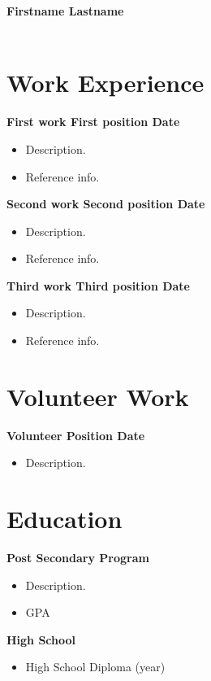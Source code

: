 \documentclass{article}
\begin{document}
{\selectfont

\begin{center}
\textbf{\huge Firstname Lastname}\\
\textbf{               }\\
\end{center}
\begin{minipage}[t]{0.66\textwidth}
\section*{Work Experience}
\textbf{First work \textbar{} First position \textbar{} Date}
\begin{itemize}
\item Description.
\item Reference info.
\end{itemize}
\textbf{Second work \textbar{} Second position \textbar{} Date}
\begin{itemize}
\item Description.
\item Reference info.
\end{itemize}
\textbf{Third work \textbar{} Third position \textbar{} Date}
\begin{itemize}
\item Description.
\item Reference info.
\end{itemize}
\section*{Volunteer Work}
\textbf{Volunteer \textbar{} Position \textbar{} Date}
\begin{itemize}
\item Description.
\end{itemize}
\section*{Education}
\textbf{Post Secondary \textbar{} Program}
\begin{itemize}
\item Description.
\item GPA
\end{itemize}
\textbf{High School}
\begin{itemize}
\item High School Diploma (year)
\end{itemize}
\end{minipage}
\begin{minipage}[t]{0.33\textwidth}

\end{minipage}}
\end{document}
